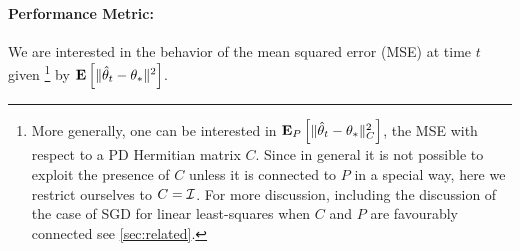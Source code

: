 \paragraph{Performance Metric:}  
We are interested in the behavior of the mean squared error (MSE) at time $t$ given%
\footnote{More generally, one can be interested in $\mathbf{E}_P\left[\| \hat{\theta}_t-\theta_*\|_C^2\right]$, the MSE with respect to a PD Hermitian matrix $C$. Since in general it is not possible to exploit the presence of $C$ unless it is connected to $P$ in a special way,
here we restrict ourselves to $C = \mathcal{I}$. For more discussion, including the discussion of the case of SGD for linear least-squares when $C$ and $P$ are favourably connected see \cref{sec:related}.}
 by $\mathbf{E}\left[\| \hat{\theta}_t-\theta_*\|^2\right]$. 
\begin{comment}
\footnote{We note here that $\E[\normsm{\thh_t-\ts}_C^2]$, which measures the MSE in the quadratic norm with respect to a positive definite matrix $C\succ 0$. However, unless $C$ has some special structure, it is not possible to exploit this generality in our bounds. Further, when data is bounded $\norm{C}^2$ is also bounded and it is straightforward to see that $\EEP{\norm{\thh_t-\ts}}^2_C\leq \norm{C}^2\EEP{\norm{\thh_t-\ts}^2}$. So, for the purpose of stating our results we will not use the general quadratic norm, however, will use it when we discuss the work by \cite{bach} in the linear regression setting, where its usage is relevant.}
\end{comment}
{}
